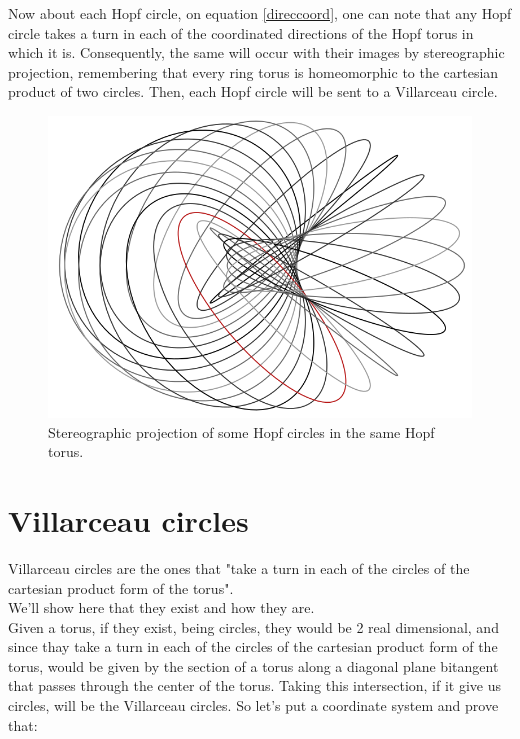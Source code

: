 
Now about each Hopf circle, on equation \ref{direccoord}, one can note that any Hopf circle takes a turn in each of the coordinated directions of the Hopf torus in which it is. Consequently, the same will occur with their images by stereographic projection, remembering that every ring torus is homeomorphic to the cartesian product of two circles. Then, each Hopf circle will be sent to a Villarceau circle.

\begin{figure}[H]
    \centering
    \includegraphics[scale=0.35]{toroHopf.png}
    \caption{Stereographic projection of some Hopf circles in the same Hopf torus.}
    \label{fig:toroHopf}
\end{figure}

\section{Villarceau circles}

Villarceau circles are the ones that "take a turn in each of the circles of the cartesian product form of the torus".\\
We'll show here that they exist and how they are.\\
Given a torus, if they exist, being circles, they would be 2 real dimensional, and since thay take a turn in each of the circles of the cartesian product form of the torus, would be given by the section of a torus along a diagonal plane bitangent that passes through the center of the torus. Taking this intersection, if it give us circles, will be the Villarceau circles. So let's put a coordinate system and prove that:\\

